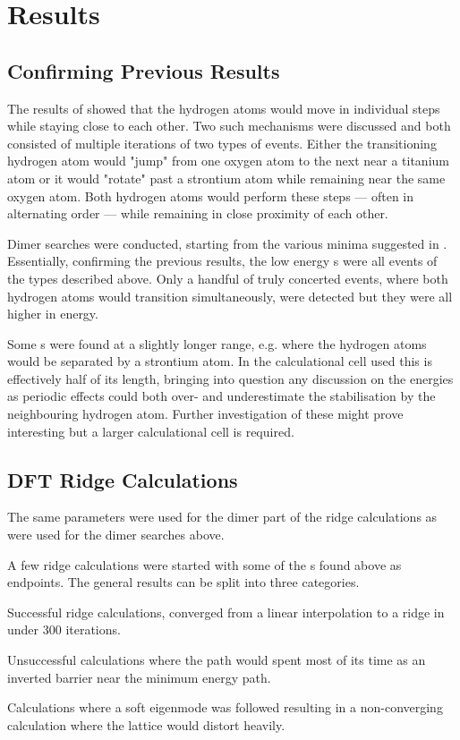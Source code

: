 \section{Results}
\label{sec:perovskites-results}
\subsection{Confirming Previous Results}
The results of \cite{double-defect-2011} showed that the hydrogen atoms would move in individual steps while staying close to each other.
Two such mechanisms were discussed and both consisted of multiple iterations of two types of events.
Either the transitioning hydrogen atom would "jump" from one oxygen atom to the next near a titanium atom or it would "rotate" past a strontium atom while remaining near the same oxygen atom.
Both hydrogen atoms would perform these steps --- often in alternating order --- while remaining in close proximity of each other.

Dimer  searches were conducted, starting from the various minima suggested in \cite{double-defect-2011}.
Essentially, confirming the previous results, the low energy s were all events of the types described above.
Only a handful of truly concerted events, where both hydrogen atoms would transition simultaneously, were detected but they were all higher in energy.

Some s were found at a slightly longer range, e.g. where the hydrogen atoms would be separated by a strontium atom.
In the calculational cell used this is effectively half of its length, bringing into question any discussion on the energies as periodic effects could both over- and underestimate the stabilisation by the neighbouring hydrogen atom.
Further investigation of these might prove interesting but a larger calculational cell is required.

\subsection{DFT Ridge Calculations}
The same parameters were used for the dimer part of the ridge calculations as were used for the dimer searches above.

A few ridge calculations were started with some of the s found above as endpoints.
The general results can be split into three categories.
\bit
\item Successful ridge calculations, converged from a linear interpolation to a ridge in under 300 iterations.
\item Unsuccessful calculations where the path would spent most of its time as an inverted barrier near the minimum energy path.
\item Calculations where a soft eigenmode was followed resulting in a non-converging calculation where the lattice would distort heavily.
\eit

